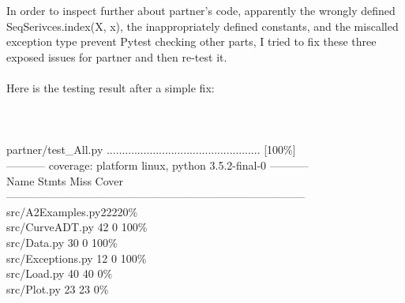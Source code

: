 \documentclass[12pt]{article}
\begin{document}
In order to inspect further about partner’s code, apparently the wrongly defined SeqSerivces.index(X, x), the inappropriately defined constants, and the miscalled exception type prevent Pytest checking other parts, I tried to fix these three exposed issues for partner and then re-test it.\\
\\
Here is the testing result after a simple fix:\\
\\
\\
\\
partner/test\_All.py ..................................................   [100\%]\\
----------- coverage: platform linux, python 3.5.2-final-0 -----------\\
Name \hspace{26ex}                        Stmts\hspace{4ex}    Miss\hspace{3ex}    Cover\\
---------------------------------------------------------------------------------\\
src/A2Examples.py\hspace{17ex}22\hspace{8ex}22\hspace{6ex}0\%\\
src/CurveADT.py     \hspace{17ex}            42 \hspace{8ex}0\hspace{4ex}   100\%\\
src/Data.py             \hspace{23ex}            30 \hspace{7ex}     0 \hspace{4ex}  100\%\\
src/Exceptions.py    \hspace{17ex}             12\hspace{8ex}      0 \hspace{3ex}   100\%\\
src/Load.py           \hspace{23ex}              40\hspace{7ex}     40\hspace{6ex}       0\%\\
src/Plot.py            \hspace{24ex}              23\hspace{7ex}     23 \hspace{5ex}      0\%\\
\end{document}
